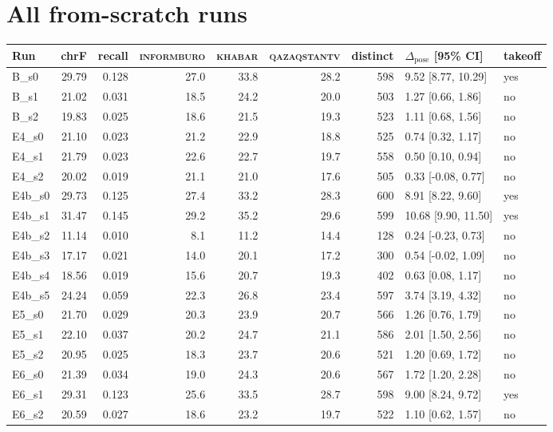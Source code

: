 \documentclass[11pt,twocolumn,a4paper]{article}
\newcommand{\cpl}{\Delta_{\text{pose}}}
\newcommand{\src}[1]{\textsc{#1}}
\newcommand{\ib}{\src{informburo}}
\newcommand{\kh}{\src{khabar}}
\newcommand{\qz}{\src{qazaqstantv}}
\begin{document}
\section{All from-scratch runs}
\label{app:runs}

\begin{table}[H]
\centering\footnotesize
\begin{tabular}{lrrrrrrll}
\toprule
Run & chrF & recall & \ib & \kh & \qz & distinct & $\cpl$ [95\% CI] & takeoff \\
\midrule
B\_s0 & 29.79 & 0.128 & 27.0 & 33.8 & 28.2 & 598 & 9.52 [8.77, 10.29] & yes \\
B\_s1 & 21.02 & 0.031 & 18.5 & 24.2 & 20.0 & 503 & 1.27 [0.66, 1.86] & no \\
B\_s2 & 19.83 & 0.025 & 18.6 & 21.5 & 19.3 & 523 & 1.11 [0.68, 1.56] & no \\
E4\_s0 & 21.10 & 0.023 & 21.2 & 22.9 & 18.8 & 525 & 0.74 [0.32, 1.17] & no \\
E4\_s1 & 21.79 & 0.023 & 22.6 & 22.7 & 19.7 & 558 & 0.50 [0.10, 0.94] & no \\
E4\_s2 & 20.02 & 0.019 & 21.1 & 21.0 & 17.6 & 505 & 0.33 [-0.08, 0.77] & no \\
E4b\_s0 & 29.73 & 0.125 & 27.4 & 33.2 & 28.3 & 600 & 8.91 [8.22, 9.60] & yes \\
E4b\_s1 & 31.47 & 0.145 & 29.2 & 35.2 & 29.6 & 599 & 10.68 [9.90, 11.50] & yes \\
E4b\_s2 & 11.14 & 0.010 & 8.1 & 11.2 & 14.4 & 128 & 0.24 [-0.23, 0.73] & no \\
E4b\_s3 & 17.17 & 0.021 & 14.0 & 20.1 & 17.2 & 300 & 0.54 [-0.02, 1.09] & no \\
E4b\_s4 & 18.56 & 0.019 & 15.6 & 20.7 & 19.3 & 402 & 0.63 [0.08, 1.17] & no \\
E4b\_s5 & 24.24 & 0.059 & 22.3 & 26.8 & 23.4 & 597 & 3.74 [3.19, 4.32] & no \\
E5\_s0 & 21.70 & 0.029 & 20.3 & 23.9 & 20.7 & 566 & 1.26 [0.76, 1.79] & no \\
E5\_s1 & 22.10 & 0.037 & 20.2 & 24.7 & 21.1 & 586 & 2.01 [1.50, 2.56] & no \\
E5\_s2 & 20.95 & 0.025 & 18.3 & 23.7 & 20.6 & 521 & 1.20 [0.69, 1.72] & no \\
E6\_s0 & 21.39 & 0.034 & 19.0 & 24.3 & 20.6 & 567 & 1.72 [1.20, 2.28] & no \\
E6\_s1 & 29.31 & 0.123 & 25.6 & 33.5 & 28.7 & 598 & 9.00 [8.24, 9.72] & yes \\
E6\_s2 & 20.59 & 0.027 & 18.6 & 23.2 & 19.7 & 522 & 1.10 [0.62, 1.57] & no \\

\end{tabular}
\end{table}
\end{document}
